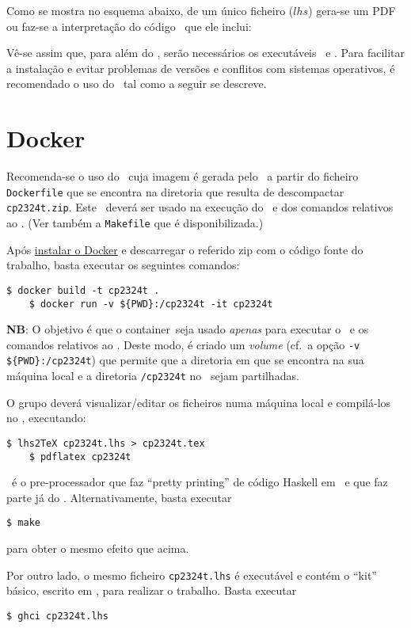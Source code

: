 \documentclass[11pt, a4paper, fleqn]{article}
\newcommand{\Varid}[1]{\mathit{#1}}
\begin{document}
Como se mostra no esquema abaixo, de um único ficheiro (\ensuremath{\Varid{lhs}})
gera-se um PDF ou faz-se a interpretação do código \Haskell\ que ele inclui:

	\esquema

Vê-se assim que, para além do \GHCi, serão necessários os executáveis \PdfLatex\ e
\LhsToTeX. Para facilitar a instalação e evitar problemas de versões e
conflitos com sistemas operativos, é recomendado o uso do \Docker\ tal como
a seguir se descreve.

\section{Docker} \label{sec:docker}

Recomenda-se o uso do \container\ cuja imagem é gerada pelo \Docker\ a partir do ficheiro
\texttt{Dockerfile} que se encontra na diretoria que resulta de descompactar
\texttt{cp2324t.zip}. Este \container\ deverá ser usado na execução
do \GHCi\ e dos comandos relativos ao \Latex. (Ver também a \texttt{Makefile}
que é disponibilizada.)

Após \href{https://docs.docker.com/engine/install/}{instalar o Docker} e
descarregar o referido zip com o código fonte do trabalho,
basta executar os seguintes comandos:
\begin{Verbatim}[fontsize=\small]
    $ docker build -t cp2324t .
    $ docker run -v ${PWD}:/cp2324t -it cp2324t
\end{Verbatim}
\textbf{NB}: O objetivo é que o container\ seja usado \emph{apenas} 
para executar o \GHCi\ e os comandos relativos ao \Latex.
Deste modo, é criado um \textit{volume} (cf.\ a opção \texttt{-v \$\{PWD\}:/cp2324t}) 
que permite que a diretoria em que se encontra na sua máquina local 
e a diretoria \texttt{/cp2324t} no \container\ sejam partilhadas.

O grupo deverá visualizar/editar os ficheiros numa máquina local e compilá-los no \container, executando:
\begin{Verbatim}[fontsize=\small]
    $ lhs2TeX cp2324t.lhs > cp2324t.tex
    $ pdflatex cp2324t
\end{Verbatim}
\LhsToTeX\ é o pre-processador que faz ``pretty printing'' de código Haskell
em \Latex\ e que faz parte já do \container. Alternativamente, basta executar
\begin{Verbatim}[fontsize=\small]
    $ make
\end{Verbatim}
para obter o mesmo efeito que acima.

Por outro lado, o mesmo ficheiro \texttt{cp2324t.lhs} é executável e contém
o ``kit'' básico, escrito em \Haskell, para realizar o trabalho. Basta executar
\begin{Verbatim}[fontsize=\small]
    $ ghci cp2324t.lhs
\end{Verbatim}
\end{document}
